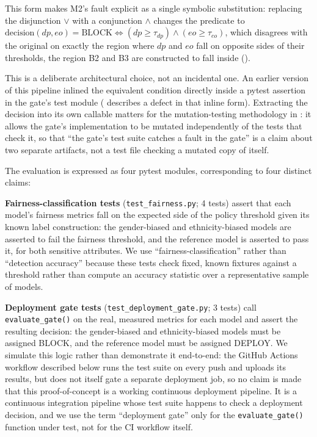\documentclass[]{einformatica}
\begin{document}
This form makes M2's fault explicit as a single symbolic substitution: replacing the disjunction $\lor$ with a conjunction $\land$ changes the predicate to $\mathrm{decision}(dp, eo) = \mathrm{BLOCK} \iff (dp \geq \tau_{dp}) \land (eo \geq \tau_{eo})$, which disagrees with the original on exactly the region where $dp$ and $eo$ fall on opposite sides of their thresholds, the region B2 and B3 are constructed to fall inside ().

This is a deliberate architectural choice, not an incidental one. An earlier version of this pipeline inlined the equivalent condition directly inside a pytest assertion in the gate's test module ( describes a defect in that inline form). Extracting the decision into its own callable matters for the mutation-testing methodology in : it allows the gate's implementation to be mutated independently of the tests that check it, so that ``the gate's test suite catches a fault in the gate'' is a claim about two separate artifacts, not a test file checking a mutated copy of itself.

The evaluation is expressed as four pytest modules, corresponding to four distinct claims:

\textbf{Fairness-classification tests} (\texttt{test\_fairness.py}; 4 tests) assert that each model's fairness metrics fall on the expected side of the policy threshold given its known label construction: the gender-biased and ethnicity-biased models are asserted to fail the fairness threshold, and the reference model is asserted to pass it, for both sensitive attributes. We use ``fairness-classification'' rather than ``detection accuracy'' because these tests check fixed, known fixtures against a threshold rather than compute an accuracy statistic over a representative sample of models.

\textbf{Deployment gate tests} (\texttt{test\_deployment\_gate.py}; 3 tests) call \texttt{evaluate\_gate()} on the real, measured metrics for each model and assert the resulting decision: the gender-biased and ethnicity-biased models must be assigned BLOCK, and the reference model must be assigned DEPLOY. We simulate this logic rather than demonstrate it end-to-end: the GitHub Actions workflow described below runs the test suite on every push and uploads its results, but does not itself gate a separate deployment job, so no claim is made that this proof-of-concept is a working continuous deployment pipeline. It is a continuous integration pipeline whose test suite happens to check a deployment decision, and we use the term ``deployment gate'' only for the \texttt{evaluate\_gate()} function under test, not for the CI workflow itself.
\end{document}

